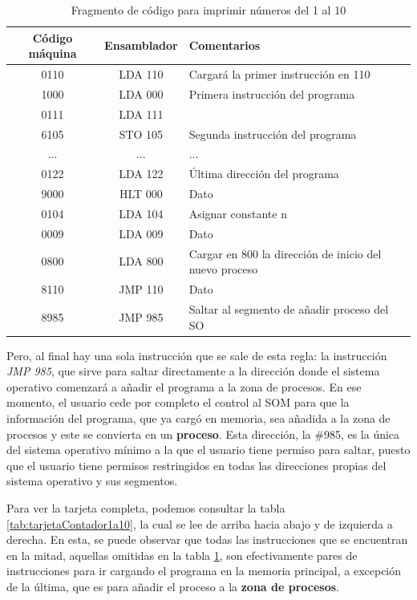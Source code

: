 \documentclass[letterpaper,12pt,oneside]{book}
\begin{document}
		\begin{table}[h]
			  \centering
			  \begin{tabular}{|c|c|p{8cm}|}
			    \hline
		    	\textbf{Código máquina} & \textbf{Ensamblador} & \textbf{Comentarios} \\
			    \hline
				0110  & LDA 110 & Cargará la primer instrucción en 110 \\
				\hline
				1000 & LDA 000 & Primera instrucción del programa \\
				\hline
				0111 & LDA 111 & \\
				\hline
				6105 & STO 105 & Segunda instrucción del programa \\
				\hline
				...&...&... \\
 				\hline
				0122 & LDA 122 & Última dirección del programa \\
				\hline
				9000 & HLT 000 & Dato \\
				\hline
				0104 & LDA 104 & Asignar constante n \\
				\hline
				0009 & LDA 009 & Dato \\
				\hline
				0800 & LDA 800 & Cargar en 800 la dirección de inicio del nuevo proceso \\
				\hline
				8110 &  JMP 110 & Dato \\
				\hline
				8985 & JMP 985 & Saltar al segmento de añadir proceso del SO \\
				\hline
			  \end{tabular}
			  \caption{Fragmento de código  para imprimir números del 1 al 10}
			  \label{tab:fragmentoContador1a10}
			\end{table}
  
        Pero, al final hay una sola instrucción que se sale de esta regla:
        la instrucción \textit{JMP 985}, que sirve para saltar directamente a la dirección
		donde el sistema operativo comenzará a añadir el programa a la zona de procesos. En ese momento, el usuario cede por completo el control
		al SOM para que la información del programa, que ya cargó en memoria, sea añadida a la zona de procesos y este se convierta en un 
		\textbf{proceso}. 
		Esta dirección, la \#985, es la única del sistema operativo mínimo a la que el usuario tiene permiso para saltar, puesto
		que el usuario tiene permisos restringidos en todas las direcciones propias del sistema operativo y sus segmentos.
		
		Para ver la tarjeta completa, podemos consultar la tabla \ref{tab:tarjetaContador1a10}, la cual se lee de arriba hacia abajo y de
		izquierda a derecha. En esta, se puede observar que todas las 
		instrucciones
		que se encuentran en la mitad, aquellas omitidas en la tabla \ref{tab:fragmentoContador1a10}, son efectivamente pares de instrucciones para ir 
		cargando el 
		programa en la memoria principal, a excepción de la última, que es para añadir el proceso a la \textbf{zona de procesos}.
				
\end{document}

